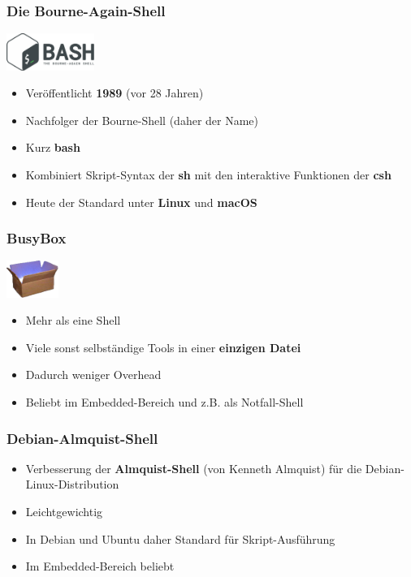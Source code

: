 \begin{frame}
    \frametitle{Die Bourne-Again-Shell}
    \includegraphics[height=1.2cm]{res/bash.png}
    \begin{itemize}
        \item Veröffentlicht \textbf{1989} (vor 28 Jahren)
        \item Nachfolger der Bourne-Shell (daher der Name)
        \item Kurz \textbf{bash}
        \item Kombiniert Skript-Syntax der \textbf{sh} mit den interaktive Funktionen der \textbf{csh}
        \item Heute der Standard unter \textbf{Linux} und \textbf{macOS}
    \end{itemize}
\end{frame}

\begin{frame}
    \frametitle{BusyBox}
    \includegraphics[height=1.2cm]{res/busybox.png}
    \begin{itemize}
        \item Mehr als eine Shell
        \item Viele sonst selbständige Tools in einer \textbf{einzigen Datei}
        \item Dadurch weniger Overhead
        \item Beliebt im Embedded-Bereich und z.B. als Notfall-Shell
    \end{itemize}
\end{frame}

\begin{frame}
    \frametitle{Debian-Almquist-Shell}
    \begin{itemize}
        \item Verbesserung der \textbf{Almquist-Shell} (von Kenneth Almquist) für die Debian-Linux-Distribution
        \item Leichtgewichtig
        \item In Debian und Ubuntu daher Standard für Skript-Ausführung
        \item Im Embedded-Bereich beliebt
    \end{itemize}
\end{frame}

